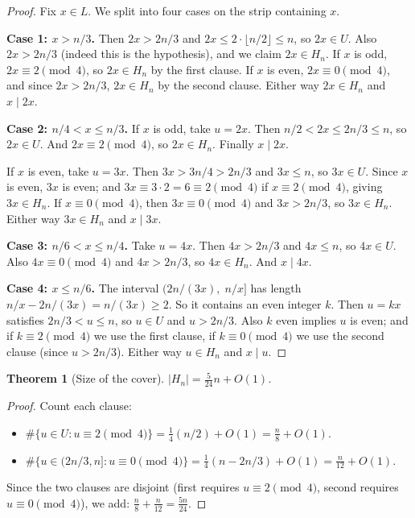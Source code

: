 \documentclass{article}
\newtheorem{theorem}{Theorem}
\begin{document}
\begin{proof}
Fix $x \in L$. We split into four cases on the strip containing $x$.

\textbf{Case 1: $x > n/3$.}
Then $2x > 2n/3$ and $2x \le 2 \cdot \lfloor n/2 \rfloor \le n$, so $2x \in U$. Also $2x > 2n/3$ (indeed this is the hypothesis), and we claim $2x \in H_n$. If $x$ is odd, $2x \equiv 2 \pmod 4$, so $2x \in H_n$ by the first clause. If $x$ is even, $2x \equiv 0 \pmod 4$, and since $2x > 2n/3$, $2x \in H_n$ by the second clause. Either way $2x \in H_n$ and $x \mid 2x$.

\textbf{Case 2: $n/4 < x \le n/3$.}
If $x$ is odd, take $u = 2x$. Then $n/2 < 2x \le 2n/3 \le n$, so $2x \in U$. And $2x \equiv 2 \pmod 4$, so $2x \in H_n$. Finally $x \mid 2x$.

If $x$ is even, take $u = 3x$. Then $3x > 3n/4 > 2n/3$ and $3x \le n$, so $3x \in U$. Since $x$ is even, $3x$ is even; and $3x \equiv 3 \cdot 2 = 6 \equiv 2 \pmod 4$ if $x \equiv 2 \pmod 4$, giving $3x \in H_n$. If $x \equiv 0 \pmod 4$, then $3x \equiv 0 \pmod 4$ and $3x > 2n/3$, so $3x \in H_n$. Either way $3x \in H_n$ and $x \mid 3x$.

\textbf{Case 3: $n/6 < x \le n/4$.}
Take $u = 4x$. Then $4x > 2n/3$ and $4x \le n$, so $4x \in U$. Also $4x \equiv 0 \pmod 4$ and $4x > 2n/3$, so $4x \in H_n$. And $x \mid 4x$.

\textbf{Case 4: $x \le n/6$.}
The interval $(2n/(3x),\; n/x]$ has length $n/x - 2n/(3x) = n/(3x) \ge 2$. So it contains an even integer $k$. Then $u = kx$ satisfies $2n/3 < u \le n$, so $u \in U$ and $u > 2n/3$. Also $k$ even implies $u$ is even; and if $k \equiv 2 \pmod 4$ we use the first clause, if $k \equiv 0 \pmod 4$ we use the second clause (since $u > 2n/3$). Either way $u \in H_n$ and $x \mid u$.
\end{proof}

\begin{theorem}[Size of the cover]
$|H_n| = \frac{5}{24} n + O(1)$.
\end{theorem}

\begin{proof}
Count each clause:
\begin{itemize}
\item $\#\{u \in U : u \equiv 2 \pmod 4\} = \frac{1}{4}(n/2) + O(1) = \frac{n}{8} + O(1)$.
\item $\#\{u \in (2n/3, n] : u \equiv 0 \pmod 4\} = \frac{1}{4}(n - 2n/3) + O(1) = \frac{n}{12} + O(1)$.
\end{itemize}
Since the two clauses are disjoint (first requires $u \equiv 2 \pmod 4$, second requires $u \equiv 0 \pmod 4$), we add: $\frac{n}{8} + \frac{n}{12} = \frac{5n}{24}$.
\end{proof}
\end{document}
